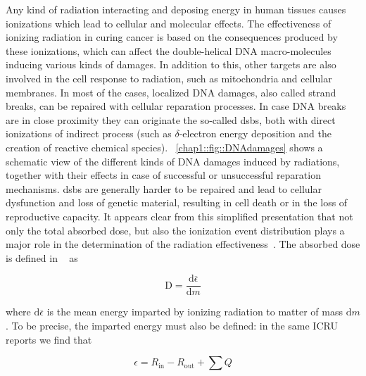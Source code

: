 Any kind of radiation interacting and deposing energy in human tissues causes ionizations which lead to cellular and molecular effects. The effectiveness of ionizing radiation in curing cancer is based on the consequences produced by these ionizations, which can affect the double-helical DNA macro-molecules inducing various kinds of damages. In addition to this, other targets are also involved in the cell response to radiation, such as mitochondria and cellular membranes. In most of the cases, localized DNA damages, also called strand breaks, can be repaired with cellular reparation processes. In case DNA breaks are in close proximity they can originate the so-called \glspl{dsb}, both with direct ionizations of indirect process (such as $\delta$-electron energy deposition and the creation of reactive chemical species). \figurename~\ref{chap1::fig::DNAdamages} shows a schematic view of the different kinds of DNA damages induced by radiations, together with their effects in case of  successful or unsuccessful reparation mechanisms. \glspl{dsb} are generally harder to be repaired and lead to cellular dysfunction and loss of genetic material, resulting in cell death or in the loss of reproductive capacity. It appears clear from this simplified presentation that not only the total absorbed dose, but also the ionization event distribution plays a major role in the determination of the radiation effectiveness~\parencite{Belli1992}.        
The absorbed dose is defined in ~\cite{ICRU1980, ICRU1998} as 

\begin{equation}
\mathrm{D} = \frac{\mathrm{d}\overline{\epsilon}}{\mathrm{d}m}
\label{chap1::eq::AbsDoseDef}
\end{equation}

where $\mathrm{d}\overline{\epsilon}$ is the mean energy imparted by ionizing radiation to matter of mass $\mathrm{d}m$. To be precise, the imparted energy must also be defined: in the same ICRU reports we find that 

\begin{equation}
\epsilon = R_{\mathrm{in}} - R_{\mathrm{out}} + \sum{Q}
\label{chap1::eq::impEnergyDef}
\end{equation}


